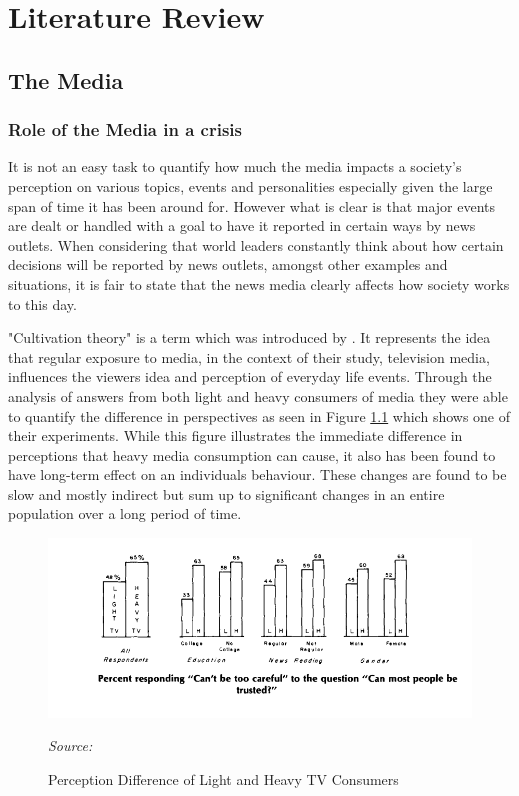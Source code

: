 \chapter{Literature Review}\label{Literature Review}

\section{The Media}

\subsection{Role of the Media in a crisis}\label{Role of the Media in a crisis}

It is not an easy task to quantify how much the media impacts a society's perception on various topics, events and personalities especially given the large span of time it has been around for. However what is clear is that major events are dealt or handled with a goal to have it reported in certain ways by news outlets. When considering that world leaders constantly think about how certain decisions will be reported by news outlets, amongst other examples and situations, it is fair to state that the news media clearly affects how society works to this day. 

"Cultivation theory" is a term which was introduced by \cite{gerbner1976living}. It represents the idea that regular exposure to media, in the context of their study, television media, influences the viewers idea and perception of everyday life events. Through the analysis of answers from both light and heavy consumers of media they were able to quantify the difference in perspectives as seen in Figure \ref{fig:tv perception} which shows one of their experiments. While this figure illustrates the immediate difference in perceptions that heavy media consumption can cause, it also has been found to have long-term effect on an individuals behaviour. These changes are found to be slow and mostly indirect but sum up to significant changes in an entire population over a long period of time.

\begin{figure}[H]
      \centering
      \includegraphics[scale=0.65]{lit_review/tv_2.png}
      \caption{Perception Difference of Light and Heavy TV Consumers}
      \label{fig:tv perception}
      \emph{Source: \cite{gerbner1976living}}
\end{figure}

